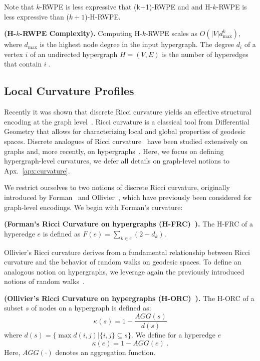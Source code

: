 \begin{rmk} Note that $k$-RWPE is less expressive that (k+1)-RWPE and and H-$k$-RWPE is less expressive than ($k+1$)-H-RWPE.
\end{rmk}

\begin{rmk}\label{thm:lape_comp} \textbf{(H-$k$-RWPE Complexity).} Computing H-$k$-RWPE scales as $O(|V| d^k_\text{max})$, where $d_\text{max}$ is the highest node degree in the input hypergraph. The degree $d_i$ of a vertex $i$ of an undirected hypergraph $H = (V,E)$ is the number of hyperedges that contain $i$ \citep{klamt2009hypergraphs}.
\end{rmk}



\subsection{Local Curvature Profiles}
Recently it was shown that discrete Ricci curvature yields an effective structural encoding at the graph level~\citep{fesser2023effective}.
Ricci curvature is a classical tool from Differential Geometry that allows for characterizing local and global properties of geodesic spaces. Discrete analogues of Ricci curvature~\citep{forman,ollivier2007ricci} have been studied extensively on graphs and, more recently, on hypergraphs~\citep{leal2021forman,coupette2022ollivier,saucan2019forman}. Here, we focus on defining hypergraph-level curvatures, we defer all details on graph-level notions to Apx.~\ref{apx:curvature}. 

We restrict ourselves to two notions of discrete Ricci curvature, originally introduced by Forman~\citep{forman} and Ollivier~\citep{ollivier2007ricci}, which have previously been considered for graph-level encodings. We begin with Forman's curvature:\\
%
\begin{defn}\label{def:fr} \textbf{(Forman's Ricci Curvature on hypergraphs (H-FRC)~\citep{leal2021forman}).} The H-FRC of a hyperedge $e$ is defined as  $F(e)=\sum_{k \in e} (2-d_k)$.
\end{defn}
%
Ollivier's Ricci curvature derives from a fundamental relationship between Ricci curvature and the behavior of random walks on geodesic spaces. To define an analogous notion on hypergraphs, we leverage again the previously introduced notions of random walks~\citep{coupette2022ollivier}.\\
%


\begin{defn}\label{def:orc} \textbf{(Ollivier's Ricci Curvature on hypergraphs (H-ORC)~\citep{coupette2022ollivier}).}
\noindent The H-ORC of a subset $s$ of nodes on a hypergraph is defined as:
\begin{equation} \kappa(s) = 1 - \frac{AGG(s)}{d(s)}\end{equation}
where $d(s)=\{\max d(i,j) | \{i,j\} \subseteq s\}$. We define for a
hyperedge $e$
\begin{equation} \kappa(e) = 1 - AGG(e) \; .\end{equation}
Here, $AGG(\cdot)$ denotes an aggregation function.
\end{defn}

